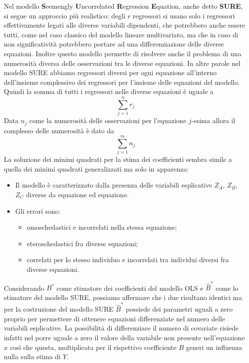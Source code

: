 \documentclass[a4page, 11pt]{article} %
\begin{document}
Nel modello \textbf{S}eemengly \textbf{U}ncorrelated \textbf{R}egression \textbf{E}quation, anche detto \textbf{SURE}, si segue un approccio più realistico: degli $r$ regressori si usano solo i regressori effettivamente legati alle diverse variabili dipendenti, che potrebbero anche essere tutti, come nel caso classico del modello lineare multivariato, ma che in caso di non significatività potrebbero portare ad una differenziazione delle diverse equazioni. Inoltre questo modello permette di risolvere anche il problema di una numerosità diversa delle osservazioni tra le diverse equazioni.
\newline
In altre parole nel modello SURE abbiamo regressori diversi per ogni equazione all’interno dell’insieme complessivo dei regressori per l’insieme delle equazioni del modello. 
\newline
Quindi la somma di tutti i regressori nelle diverse equazioni è uguale a
\begin{equation*}
\sum_{j=1}^n r_j
\end{equation*}
Data $n_j$ come la numerosità delle osservazioni per l’equazione $j$-esima allora il complesso delle numerosità è dato da 
\begin{equation*}
\sum_{j=1}^m n_j
\end{equation*}
La soluzione dei minimi quadrati per la stima dei coefficienti sembra simile a quella dei minimi quadrati generalizzati ma solo in apparenza: 
\begin{itemize}
\item Il modello è caratterizzato dalla presenza delle variabili esplicative $Z_A$, $Z_B$, $Z_C$ diverse da equazione ed equazione.
\item Gli errori sono:
	\begin{itemize}[noitemsep]
	\item omoschedastici e incorrelati nella stessa equazione;
	\item eteroschedastici fra diverse equazioni;
	\item correlati per lo stesso individuo e incorrelati tra individui diversi fra diverse equazioni.
	\end{itemize}
\end{itemize}
Considerando $B^*$ come stimatore dei coefficienti del modello OLS e $\hat{B}^*$ come lo stimatore del modello SURE, possiamo affermare che i due risultano identici ma per la costruzione del modello SURE $\hat{B}^*$ possiede dei parametri uguali a zero proprio per permettere di ottenere equazioni differenziate nel numero delle variabili esplicative. La possibilità di differenziare il numero di covariate risiede infatti nel porre uguale a zero il valore della variabile non presente nell'equazione $x$ così che questa, moltiplicata per il rispettivo coefficiente $B$ generi un influenza nulla sulla stima di $Y$. 
\end{document}

